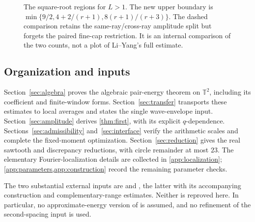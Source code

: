 \documentclass[11pt,reqno]{amsart}
\numberwithin{equation}{section}
\theoremstyle{definition}
\theoremstyle{remark}
\newcommand{\T}{\mathbb T}
\begin{document}
\begin{figure}[tb]
\centering
{}
\caption{The square-root regions for $L>1$. The new upper boundary is
$\min\{9/2,4+2/(r+1),8(r+1)/(r+3)\}$.
The dashed comparison retains the same-ray/cross-ray amplitude split but forgets the paired fine-cap restriction.
It is an internal comparison of the two counts, not a plot of Li--Yang's full estimate.}
\label{fig:region}
\end{figure}

\subsection{Organization and inputs}
Section~\ref{sec:algebra} proves the algebraic pair-energy theorem on $\T^2$, including its
coefficient and finite-window forms. Section~\ref{sec:transfer} transports these estimates
to local averages and states the single wave-envelope input.
Section~\ref{sec:amplitude} derives \cref{thm:first}, with its explicit $q$-dependence.
Sections~\ref{sec:admissibility} and~\ref{sec:interface} verify the arithmetic scales and
complete the fixed-moment optimization. Section~\ref{sec:reduction} gives the real
sawtooth and discrepancy reductions, with circle remainder at most $23$.
The elementary Fourier-localization details are collected in \cref{app:localization};
\cref{app:parameters,app:construction} record the remaining parameter checks.

The two substantial external inputs are \cite[Theorem~2]{GM} and
\cite[Lemma~4.4]{LY}, the latter with its accompanying construction and complementary-range
estimates. Neither is reproved here. In particular, no approximate-energy version of
\cite{JW} is assumed, and no refinement of the second-spacing input is used.
\end{document}
